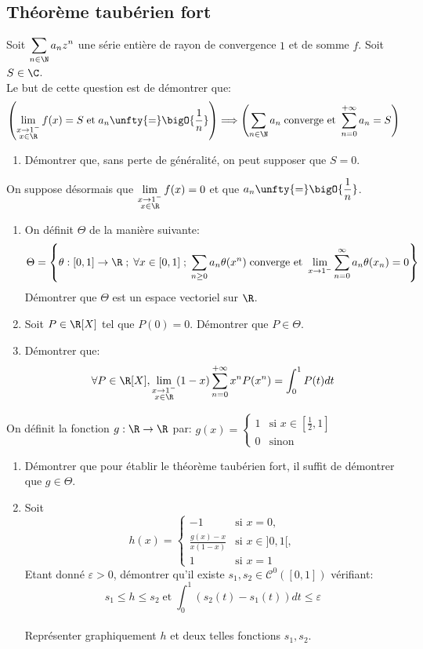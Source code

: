 \documentclass{book}
\begin{document}
\subsection{Théorème taubérien fort}
Soit $\displaystyle\sum_{n\in \N} a_nz^n$ une série entière de rayon de convergence $1$ et de somme $f$. Soit $S\in\C$. 
\\Le but de cette question est de démontrer que: $$\left(\lim_{\substack{x\to1^-\\x\in \R}}f(x)=S \; \text{et} \; a_n\unfty{=}\bigO{\frac{1}{n}}\right)\Longrightarrow\left(\sum_{n\in \N} a_n \; \text{converge et } \sum_{n=0}^{+ \infty}a_n=S\right)$$
\begin{enumerate}
	\item Démontrer que, sans perte de généralité, on peut supposer que $S=0$.
\end{enumerate}
On suppose désormais que $\lim\limits_{\substack{x\to1^-\\x\in \R}}f(x)=0$ et que $a_n\unfty{=}\displaystyle\bigO{\frac{1}{n}}$.
\begin{enumerate}[resume]
	\item On définit $\Theta$ de la manière suivante: $$\Theta=\left\{\theta:[0,1]\to\R\; ;\;\forall x\in[0,1]\; ; \; \sum_{n\geq0}a_n\theta(x^n) \; \text{converge et }\lim_{x\to1^-}\sum_{n=0}^{\infty}a_n\theta(x_n)=0\right\}$$
	Démontrer que $\Theta$ est un espace vectoriel sur $\R$.
	\item Soit $P\in\R[X]$ tel que $P(0)=0$. Démontrer que  $P\in\Theta$.
	\item Démontrer que: $$\forall P\in\R[X], \lim_{\substack{x\to1^-\\x\in \R}}(1-x)\sum_{n=0}^{+\infty}x^nP(x^n)=\int_0^1P(t)dt$$
\end{enumerate}
On définit la fonction $g:\R\to\R$ par: $g(x)=\begin{cases}
	1 &\text{si }x\in\left[\displaystyle\frac{1}{2},1\right]\\
	0 &\text{sinon}
\end{cases}$
\begin{enumerate}[resume]
	\item Démontrer que pour établir le théorème taubérien fort, il suffit de démontrer que $g\in\Theta$.
	\item Soit $$h(x)=\begin{cases}
		-1 &\text{si } x=0,\\
		\frac{g(x)-x}{x(1-x)} &\text{si } x\in]0,1[,\\
		1 &\text{si }x=1
	\end{cases}$$
	Etant donné $\varepsilon>0$, démontrer qu'il existe $s_1,s_2\in\mathcal{C}^0([0,1])$ vérifiant: $$s_1\leq h\leq s_2 \;\text{et}\; \int_0^1(s_2(t)-s_1(t))dt\leq\varepsilon$$
	\\Représenter graphiquement $h$ et deux telles fonctions $s_1,s_2$.
\end{enumerate}
\end{document}
